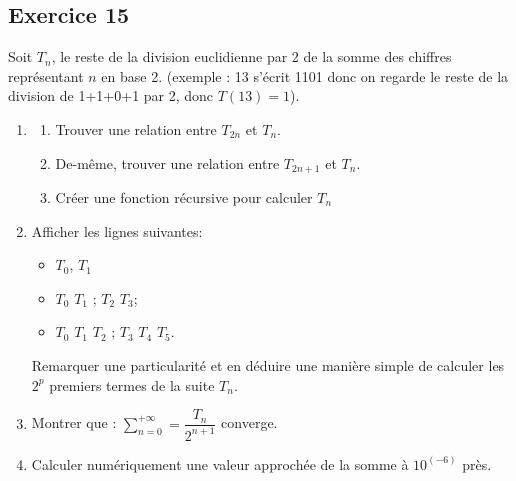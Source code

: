 \documentclass[10pt,fleqn]{article} %
\begin{document}
\begin{multicols}{2}
%
%

\subsection*{Exercice 15}
Soit $T_n$, le reste de la division euclidienne par 2 de la somme des chiffres représentant $n$ en base 2.
(exemple : 13 s'écrit 1101 donc on regarde le reste de la division de 1+1+0+1 par 2, donc $T(13)=1$). 

\begin{enumerate} 
\item \begin{enumerate}
\item Trouver une relation entre $T_{2n}$ et $T_n$.
\item De-même, trouver une relation entre $T_{2n+1}$ et $T_n$.
\item Créer une fonction récursive pour calculer $T_n$
\end{enumerate}
\item Afficher les lignes suivantes: 
\begin{itemize}
\item $T_0$, $T_1$
\item $T_0$  $T_1$ ; $T_2$ $T_3$;
\item $T_0$ $T_1$ $T_2$    ; $T_3$ $T_4$ $T_5$.
\end{itemize} 
Remarquer une particularité et en déduire une manière simple de calculer les $2^p$ premiers termes de la suite $T_n$.
\item Montrer que : $\sum\limits_{n=0}^{+\infty} = \dfrac{T_n}{2^{n+1}}$ converge.
\item Calculer numériquement une valeur approchée de la somme à $10^(-6)$ près.
\end{enumerate}


\end{multicols}
\end{document}
